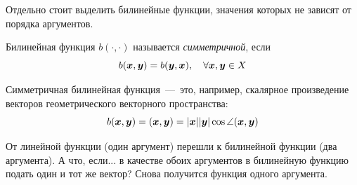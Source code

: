 \documentclass[a4paper,12pt]{article}
\begin{document}
  Отдельно стоит выделить билинейные функции, значения которых не зависят от порядка аргументов.
  
  \begin{definition}
    Билинейная функция $b(\cdot, \cdot)$ называется \emph{симметричной}, если
    \[
      b(\boldsymbol x, \boldsymbol y) = b(\boldsymbol y, \boldsymbol x),\quad \forall \boldsymbol x, \boldsymbol y \in X
    \]
  \end{definition}
  
  \begin{eqexample}
    Симметричная билинейная функция~---~это, например, скалярное произведение векторов геометрического векторного пространства:
    \begin{equation}\label{eq:bili-example}
      b(\boldsymbol x, \boldsymbol y) = (\boldsymbol x, \boldsymbol y) = |\boldsymbol x| |\boldsymbol y| \cos\angle(\boldsymbol x, \boldsymbol y)
    \end{equation}
  \end{eqexample}
  
  От линейной функции (один аргумент) перешли к билинейной функции (два аргумента).
  А что, если...
  в качестве обоих аргументов в билинейную функцию подать один и тот же вектор?
  Снова получится функция одного аргумента.
  
\end{document}
